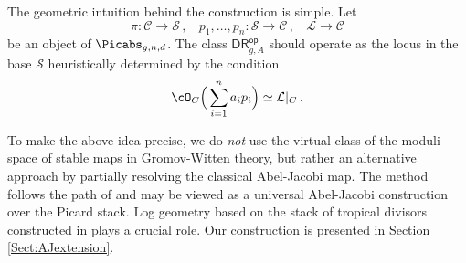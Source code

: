 The geometric intuition behind the construction is simple.
Let
$$\pi:\mathcal{C}\rightarrow \mathcal{S}\, ,
\ \ \ \ p_1,\ldots,p_n: \mathcal{S} \rightarrow \mathcal{C}\, ,
\ \ \ \ \mathcal{L}\rightarrow \mathcal{C}$$
be an object of $\Picabs_{g,n,d}$.
The class
$\mathsf{DR}^{\mathsf{op}}_{g,A}$ should operate as the
locus in the base $\mathcal{S}$ heuristically determined by the condition
$$
\cO_C\Big(\sum_{i=1}^n a_i p_i\Big) \simeq \mathcal{L}|_{C} \,.$$




To make the above idea precise, we do {\em not} use the virtual class of the moduli space of stable
maps in Gromov-Witten theory, but rather an alternative approach by
partially resolving the classical Abel-Jacobi map.
The method follows the path
of \cite{Holmes2017Extending-the-d,Holmes2017Multiplicativit}
and
may be viewed  as a universal Abel-Jacobi construction
over the Picard stack.
Log geometry based on the stack of tropical divisors constructed in \cite{Marcus2017Logarithmic-com}
plays a crucial role.
Our construction is presented in Section \ref{Sect:AJextension}.

